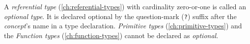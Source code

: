 A \emph{referential type} (\ref{ch:referential-types})
with cardinality zero-or-one is called an \emph{optional type}.
It is declared optional by the question-mark (\verb|?|) suffix
after the \emph{concept}'s name in a type declaration.
\emph{Primitive types} (\ref{ch:primitive-types})
and the \emph{Function types} (\ref{ch:function-types})
cannot be declared as \emph{optional}.
